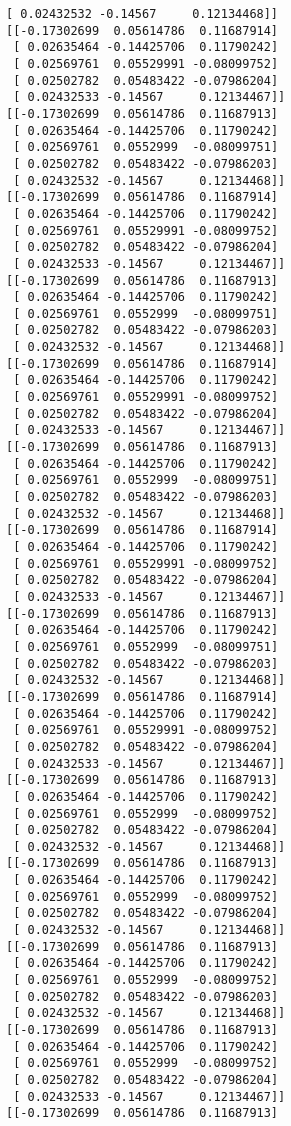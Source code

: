 \documentclass[11pt]{article}
\begin{document}
\begin{Verbatim}[commandchars=\\\{\}]
 [ 0.02432532 -0.14567     0.12134468]]
[[-0.17302699  0.05614786  0.11687914]
 [ 0.02635464 -0.14425706  0.11790242]
 [ 0.02569761  0.05529991 -0.08099752]
 [ 0.02502782  0.05483422 -0.07986204]
 [ 0.02432533 -0.14567     0.12134467]]
[[-0.17302699  0.05614786  0.11687913]
 [ 0.02635464 -0.14425706  0.11790242]
 [ 0.02569761  0.0552999  -0.08099751]
 [ 0.02502782  0.05483422 -0.07986203]
 [ 0.02432532 -0.14567     0.12134468]]
[[-0.17302699  0.05614786  0.11687914]
 [ 0.02635464 -0.14425706  0.11790242]
 [ 0.02569761  0.05529991 -0.08099752]
 [ 0.02502782  0.05483422 -0.07986204]
 [ 0.02432533 -0.14567     0.12134467]]
[[-0.17302699  0.05614786  0.11687913]
 [ 0.02635464 -0.14425706  0.11790242]
 [ 0.02569761  0.0552999  -0.08099751]
 [ 0.02502782  0.05483422 -0.07986203]
 [ 0.02432532 -0.14567     0.12134468]]
[[-0.17302699  0.05614786  0.11687914]
 [ 0.02635464 -0.14425706  0.11790242]
 [ 0.02569761  0.05529991 -0.08099752]
 [ 0.02502782  0.05483422 -0.07986204]
 [ 0.02432533 -0.14567     0.12134467]]
[[-0.17302699  0.05614786  0.11687913]
 [ 0.02635464 -0.14425706  0.11790242]
 [ 0.02569761  0.0552999  -0.08099751]
 [ 0.02502782  0.05483422 -0.07986203]
 [ 0.02432532 -0.14567     0.12134468]]
[[-0.17302699  0.05614786  0.11687914]
 [ 0.02635464 -0.14425706  0.11790242]
 [ 0.02569761  0.05529991 -0.08099752]
 [ 0.02502782  0.05483422 -0.07986204]
 [ 0.02432533 -0.14567     0.12134467]]
[[-0.17302699  0.05614786  0.11687913]
 [ 0.02635464 -0.14425706  0.11790242]
 [ 0.02569761  0.0552999  -0.08099751]
 [ 0.02502782  0.05483422 -0.07986203]
 [ 0.02432532 -0.14567     0.12134468]]
[[-0.17302699  0.05614786  0.11687914]
 [ 0.02635464 -0.14425706  0.11790242]
 [ 0.02569761  0.05529991 -0.08099752]
 [ 0.02502782  0.05483422 -0.07986204]
 [ 0.02432533 -0.14567     0.12134467]]
[[-0.17302699  0.05614786  0.11687913]
 [ 0.02635464 -0.14425706  0.11790242]
 [ 0.02569761  0.0552999  -0.08099752]
 [ 0.02502782  0.05483422 -0.07986204]
 [ 0.02432532 -0.14567     0.12134468]]
[[-0.17302699  0.05614786  0.11687913]
 [ 0.02635464 -0.14425706  0.11790242]
 [ 0.02569761  0.0552999  -0.08099752]
 [ 0.02502782  0.05483422 -0.07986204]
 [ 0.02432532 -0.14567     0.12134468]]
[[-0.17302699  0.05614786  0.11687913]
 [ 0.02635464 -0.14425706  0.11790242]
 [ 0.02569761  0.0552999  -0.08099752]
 [ 0.02502782  0.05483422 -0.07986203]
 [ 0.02432532 -0.14567     0.12134468]]
[[-0.17302699  0.05614786  0.11687913]
 [ 0.02635464 -0.14425706  0.11790242]
 [ 0.02569761  0.0552999  -0.08099752]
 [ 0.02502782  0.05483422 -0.07986204]
 [ 0.02432533 -0.14567     0.12134467]]
[[-0.17302699  0.05614786  0.11687913]

\end{Verbatim}
\end{document}

